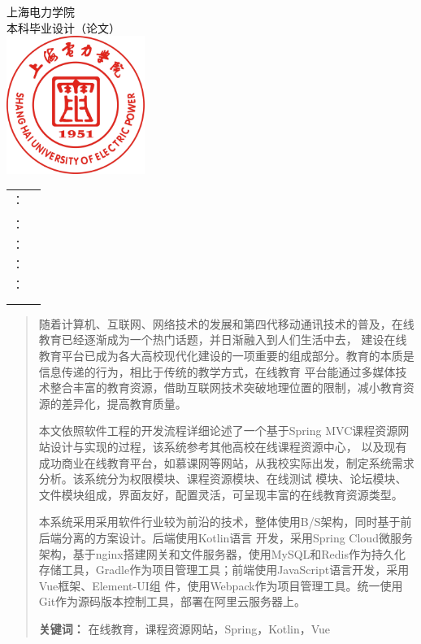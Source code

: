 \documentclass[titlepage,UTF8,linespread=1.5]{ctexart}
\newcommand{\xingkai}{\CJKfamily{xingkai}}
\renewcommand{\maketitle}{\begin{titlepage}
\begin{center}
{\xingkai \zihao{-0}上海电力学院}
\\[36pt]
{\fangsong \zihao{-0}本科毕业设计（论文）}
\\[36pt]
\includegraphics[height=45mm, width=45mm]{logo-shiep.png}
\\[36pt]
{\zihao{4}
\renewcommand\arraystretch{1.2}
\begin{tabular}{rc}
    \makebox[4em][s]{题\hspace{\fill}目}：& \underline{\makebox[15em]{基于Spring MVC}} \\
                                         & \underline{\makebox[15em]{课程资源网站设计与实现}} \\
    \makebox[4em][s]{院\hspace{\fill}系}：& \underline{\makebox[15em]{计算机科学与技术学院}} \\
    \makebox[4em][s]{专业年级}：          & \underline{\makebox[15em]{网络工程2014级}} \\
    \makebox[4em][s]{学生姓名}：          & \makebox[15em][s]{\underline{\makebox[5em]{潘成}}\hspace{\fill}
                                          学号：\underline{\makebox[6em]{\phantom{|}20142520\phantom{|}}}} \\ 
    \makebox[4em][s]{指导教师}：          & \underline{\makebox[15em]{周平}} \\
    & \\
    & \makebox[15em][r]{\today}
\end{tabular}
}
\end{center}
\end{titlepage}}
\begin{document}
\maketitle

{\renewcommand\abstractname{\heiti\zihao{3}{基于Spring MVC课程资源网站设计与实现}\\[16pt]\zihao{4}{摘要}}
    \begin{abstract}\par
        随着计算机、互联网、网络技术的发展和第四代移动通讯技术的普及，在线教育已经逐渐成为一个热门话题，并日渐融入到人们生活中去，
        建设在线教育平台已成为各大高校现代化建设的一项重要的组成部分。教育的本质是信息传递的行为，相比于传统的教学方式，在线教育
        平台能通过多媒体技术整合丰富的教育资源，借助互联网技术突破地理位置的限制，减小教育资源的差异化，提高教育质量。\par
        本文依照软件工程的开发流程详细论述了一个基于Spring MVC课程资源网站设计与实现的过程，该系统参考其他高校在线课程资源中心，
        以及现有成功商业在线教育平台，如慕课网等网站，从我校实际出发，制定系统需求分析。该系统分为权限模块、课程资源模块、在线测试
        模块、论坛模块、文件模块组成，界面友好，配置灵活，可呈现丰富的在线教育资源类型。\par
        本系统采用采用软件行业较为前沿的技术，整体使用B/S架构，同时基于前后端分离的方案设计。后端使用Kotlin\cite{kotlin}语言
        开发，采用Spring Cloud\cite{spring-cloud}微服务架构，基于nginx搭建网关和文件服务器，使用MySQL和Redis作为持久化
        存储工具，Gradle\cite{gradle}作为项目管理工具；前端使用JavaScript语言开发，采用Vue\cite{vue}框架、Element-UI组
        件，使用Webpack\cite{webpack}作为项目管理工具。统一使用Git作为源码版本控制工具，部署在阿里云服务器上。\par
        \vspace{1em}
        \noindent\textbf{\heiti{}关键词：} 在线教育，课程资源网站，Spring，Kotlin，Vue
    \end{abstract}
}
\end{document}
